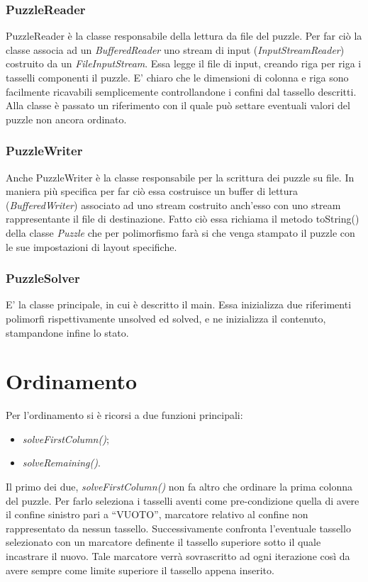 \documentclass[11pt]{article}
\begin{document}
\subsubsection{PuzzleReader}
PuzzleReader è la classe responsabile della lettura da file del puzzle. Per far ciò la classe associa ad un \textit{BufferedReader} uno stream di input (\textit{InputStreamReader}) costruito da un \textit{FileInputStream}. 
Essa legge il file di input, creando riga per riga i tasselli componenti il puzzle. E' chiaro che le dimensioni di colonna e riga sono facilmente ricavabili semplicemente controllandone i confini dal tassello descritti.
Alla classe è passato un riferimento con il quale può settare eventuali valori del puzzle non ancora ordinato.
\subsubsection{PuzzleWriter}
Anche PuzzleWriter è la classe responsabile per la scrittura dei puzzle su file. In maniera più specifica per far ciò essa costruisce un buffer di lettura (\textit{BufferedWriter}) associato ad uno stream costruito anch'esso con uno stream rappresentante il file di destinazione. Fatto ciò essa richiama il metodo toString() della classe \textit{Puzzle} che per polimorfismo farà si che venga stampato il puzzle con le sue impostazioni di layout specifiche.
\subsubsection{PuzzleSolver}
E' la classe principale, in cui è descritto il main. Essa inizializza due riferimenti polimorfi rispettivamente unsolved ed solved, e ne inizializza il contenuto, stampandone infine lo stato.
\section{Ordinamento}
Per l'ordinamento si è ricorsi a due funzioni principali:
\begin{itemize}
    \item \textit{solveFirstColumn()};
    \item \textit{solveRemaining()}.
\end{itemize}
Il primo dei due, \textit{solveFirstColumn()} non fa altro che ordinare la prima colonna del puzzle. Per farlo seleziona i tasselli aventi come pre-condizione quella di avere il confine sinistro pari a ``VUOTO'', marcatore relativo al confine non rappresentato da nessun tassello. Successivamente confronta l'eventuale tassello selezionato con un marcatore definente il tassello superiore sotto il quale incastrare il nuovo. Tale marcatore verrà sovrascritto ad ogni iterazione così da avere sempre come limite superiore il tassello appena inserito.
\end{document}
